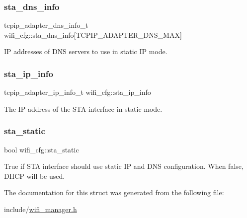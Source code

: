 \subsubsection{\texorpdfstring{sta\_dns\_info}{sta\_dns\_info}}
{\footnotesize\ttfamily tcpip\+\_\+adapter\+\_\+dns\+\_\+info\+\_\+t wifi\+\_\+cfg\+::sta\+\_\+dns\+\_\+info\mbox{[}T\+C\+P\+I\+P\+\_\+\+A\+D\+A\+P\+T\+E\+R\+\_\+\+D\+N\+S\+\_\+\+M\+AX\mbox{]}}

IP addresses of D\+NS servers to use in static IP mode. \mbox{\label{structwifi__cfg_aa7483bfab435a803a70a5043385dcc05}} 
\subsubsection{\texorpdfstring{sta\_ip\_info}{sta\_ip\_info}}
{\footnotesize\ttfamily tcpip\+\_\+adapter\+\_\+ip\+\_\+info\+\_\+t wifi\+\_\+cfg\+::sta\+\_\+ip\+\_\+info}

The IP address of the S\+TA interface in static mode. \mbox{\label{structwifi__cfg_abd668cb59692251a5382dad9e4e6c51e}} 
\subsubsection{\texorpdfstring{sta\_static}{sta\_static}}
{\footnotesize\ttfamily bool wifi\+\_\+cfg\+::sta\+\_\+static}

True if S\+TA interface should use static IP and D\+NS configuration. When false, D\+H\+CP will be used. 

The documentation for this struct was generated from the following file\+:\begin{DoxyCompactItemize}
\item 
include/\mbox{\hyperlink{wifi__manager_8h}{wifi\+\_\+manager.\+h}}\end{DoxyCompactItemize}
